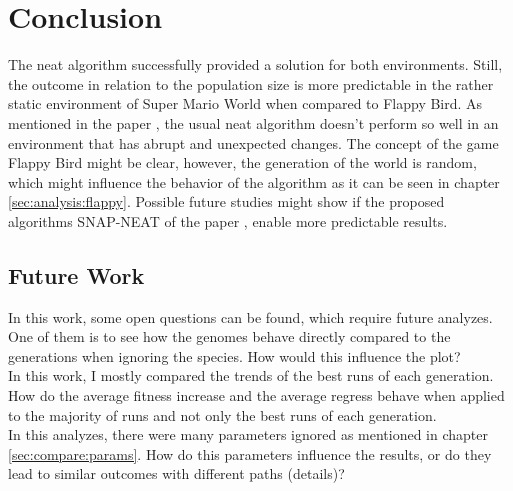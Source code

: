 %
\chapter{Conclusion}
\label{sec:conclusion}



The \gls{neat} algorithm successfully provided a solution for both environments. Still, the outcome in relation to the population size is more predictable in the rather static environment of Super Mario World when compared to Flappy Bird. As mentioned in the paper \cite{kohl_integrated_2011}, the usual \gls{neat} algorithm doesn't perform so well in an environment that has abrupt and unexpected changes. The concept of the game Flappy Bird might be clear, however, the generation of the world is random, which might influence the behavior of the algorithm as it can be seen in chapter \ref{sec:analysis:flappy}. Possible future studies might show if the proposed algorithms SNAP-NEAT of the paper \cite{kohl_integrated_2011}, enable more predictable results.

\section{Future Work}
\label{sec:conclusion:future}

In this work, some open questions can be found, which require future analyzes. \\
One of them is to see how the genomes behave directly compared to the generations when ignoring the species. How would this influence the plot?\\
In this work, I mostly compared the trends of the best runs of each generation. How do the average fitness increase and the average regress behave when applied to the majority of runs and not only the best runs of each generation.\\
In this analyzes, there were many parameters ignored as mentioned in chapter \ref{sec:compare:params}. How do this parameters influence the results, or do they lead to similar outcomes with different paths (details)?

